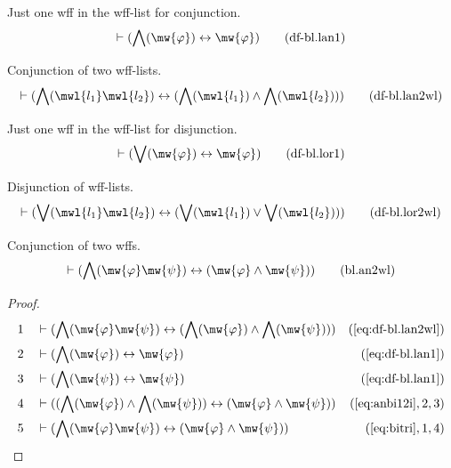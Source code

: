 \begin{metadefinition} Just one wff in the wff-list for
conjunction.
\begin{align}
\vdash ( \bigwedge( \mw{\varphi} ) \leftrightarrow \mw{\varphi}
    )\label{eq:df-bl.lan1}\tag{df-bl.lan1}
\end{align}
\end{metadefinition}

\begin{metadefinition} Conjunction of two wff-lists.
\begin{align}
\vdash ( \bigwedge( \mwl{l_1} \mwl{l_2} ) \leftrightarrow ( \bigwedge(
    \mwl{l_1} ) \wedge \bigwedge( \mwl{l_2} ) )
    )\label{eq:df-bl.lan2wl}\tag{df-bl.lan2wl}
\end{align}
\end{metadefinition}

\begin{metadefinition} Just one wff in the wff-list for
disjunction.
\begin{align}
\vdash ( \bigvee( \mw{\varphi} ) \leftrightarrow \mw{\varphi}
    )\label{eq:df-bl.lor1}\tag{df-bl.lor1}
\end{align}
\end{metadefinition}

\begin{metadefinition} Disjunction of wff-lists.
\begin{align}
\vdash ( \bigvee( \mwl{l_1} \mwl{l_2} ) \leftrightarrow ( \bigvee( \mwl{l_1} )
    \vee \bigvee( \mwl{l_2} ) ) )\label{eq:df-bl.lor2wl}\tag{df-bl.lor2wl}
\end{align}
\end{metadefinition}

\begin{lemma} Conjunction of two wffs.
\begin{align}
\vdash ( \bigwedge( \mw{\varphi} \mw{\psi} ) \leftrightarrow ( \mw{\varphi}
    \wedge \mw{\psi} ) )\label{eq:bl.an2wl}\tag{bl.an2wl}
\end{align}
\end{lemma}

\begin{proof}
\begin{align}
  1 &&  & \vdash ( \bigwedge( \mw{\varphi} \mw{\psi} ) \leftrightarrow ( \bigwedge( \mw{\varphi} ) \wedge \bigwedge( \mw{\psi} ) ) )&(\mbox{\ref{eq:df-bl.lan2wl}})\notag
  \\ 2 &&  & \vdash ( \bigwedge( \mw{\varphi} ) \leftrightarrow \mw{\varphi} )&(\mbox{\ref{eq:df-bl.lan1}})\notag
  \\ 3 &&  & \vdash ( \bigwedge( \mw{\psi} ) \leftrightarrow \mw{\psi} )&(\mbox{\ref{eq:df-bl.lan1}})\notag
  \\ 4 &&  & \vdash ( ( \bigwedge( \mw{\varphi} ) \wedge \bigwedge( \mw{\psi} ) ) \leftrightarrow ( \mw{\varphi} \wedge \mw{\psi} ) )&(\mbox{\ref{eq:anbi12i}},2,3)\notag
  \\ 5 &&  & \vdash ( \bigwedge( \mw{\varphi} \mw{\psi} ) \leftrightarrow ( \mw{\varphi} \wedge \mw{\psi} ) )&(\mbox{\ref{eq:bitri}},1,4)\notag
\end{align}
\end{proof}

